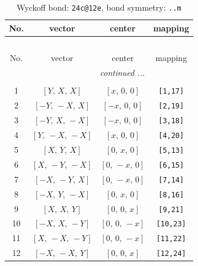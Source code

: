 \documentclass[fleqn,8pt]{jsarticle}
\begin{document}
\begin{longtable}{cccc}
\caption{Wyckoff bond: {\tt 24c@12e}, bond symmetry: {\tt ..m}}
 \\
 \hline \hline
No. & vector & center & mapping \\ \hline \endfirsthead

\multicolumn{3}{l}{\tablename\ \thetable{}} \\
 \hline \hline
No. & vector & center & mapping \\ \hline \endhead

 \hline \hline
\multicolumn{3}{r}{\footnotesize\it continued ...} \\ \endfoot

 \hline \hline
\multicolumn{3}{r}{} \\ \endlastfoot

1 & $\left[ Y,\, X,\, X \right]$ & $\left[ x,\, 0,\, 0 \right]$ & {\tt [1,17]} \\ \hline
2 & $\left[ - Y,\, - X,\, X \right]$ & $\left[ - x,\, 0,\, 0 \right]$ & {\tt [2,19]} \\ \hline
3 & $\left[ - Y,\, X,\, - X \right]$ & $\left[ - x,\, 0,\, 0 \right]$ & {\tt [3,18]} \\ \hline
4 & $\left[ Y,\, - X,\, - X \right]$ & $\left[ x,\, 0,\, 0 \right]$ & {\tt [4,20]} \\ \hline
5 & $\left[ X,\, Y,\, X \right]$ & $\left[ 0,\, x,\, 0 \right]$ & {\tt [5,13]} \\ \hline
6 & $\left[ X,\, - Y,\, - X \right]$ & $\left[ 0,\, - x,\, 0 \right]$ & {\tt [6,15]} \\ \hline
7 & $\left[ - X,\, - Y,\, X \right]$ & $\left[ 0,\, - x,\, 0 \right]$ & {\tt [7,14]} \\ \hline
8 & $\left[ - X,\, Y,\, - X \right]$ & $\left[ 0,\, x,\, 0 \right]$ & {\tt [8,16]} \\ \hline
9 & $\left[ X,\, X,\, Y \right]$ & $\left[ 0,\, 0,\, x \right]$ & {\tt [9,21]} \\ \hline
10 & $\left[ - X,\, X,\, - Y \right]$ & $\left[ 0,\, 0,\, - x \right]$ & {\tt [10,23]} \\ \hline
11 & $\left[ X,\, - X,\, - Y \right]$ & $\left[ 0,\, 0,\, - x \right]$ & {\tt [11,22]} \\ \hline
12 & $\left[ - X,\, - X,\, Y \right]$ & $\left[ 0,\, 0,\, x \right]$ & {\tt [12,24]} \\
\end{longtable}
\renewcommand{\arraystretch}{1.2}
\end{document}
